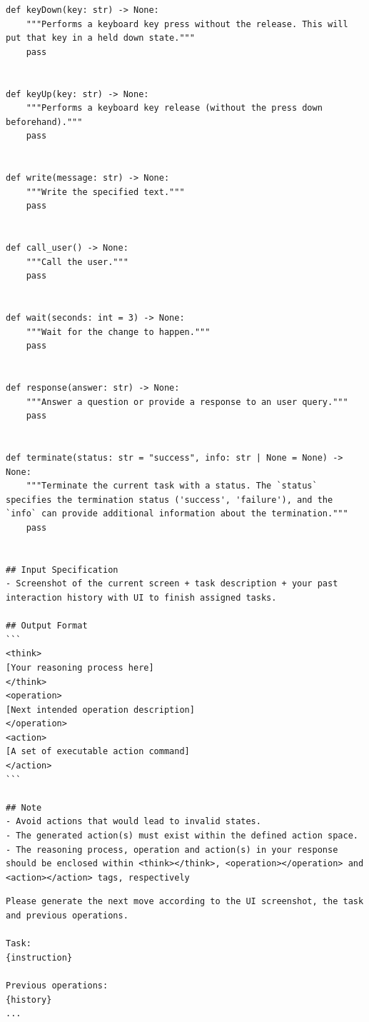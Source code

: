 \begin{tcolorbox}[title=System Prompt Template For Reasoned-Action Mode]
\begin{Verbatim}[breaklines=true, breaksymbol={}, breakanywhere=true]
def keyDown(key: str) -> None:
    """Performs a keyboard key press without the release. This will put that key in a held down state."""
    pass


def keyUp(key: str) -> None:
    """Performs a keyboard key release (without the press down beforehand)."""
    pass


def write(message: str) -> None:
    """Write the specified text."""
    pass


def call_user() -> None:
    """Call the user."""
    pass


def wait(seconds: int = 3) -> None:
    """Wait for the change to happen."""
    pass


def response(answer: str) -> None:
    """Answer a question or provide a response to an user query."""
    pass


def terminate(status: str = "success", info: str | None = None) -> None:
    """Terminate the current task with a status. The `status` specifies the termination status ('success', 'failure'), and the `info` can provide additional information about the termination."""
    pass


## Input Specification
- Screenshot of the current screen + task description + your past interaction history with UI to finish assigned tasks.

## Output Format
```
<think>
[Your reasoning process here]
</think>
<operation>
[Next intended operation description]
</operation>
<action>
[A set of executable action command]
</action>
```

## Note
- Avoid actions that would lead to invalid states.
- The generated action(s) must exist within the defined action space.
- The reasoning process, operation and action(s) in your response should be enclosed within <think></think>, <operation></operation> and <action></action> tags, respectively
\end{Verbatim}
\end{tcolorbox}

\begin{tcolorbox}[title=User Prompt Template For Direct-Action Mode and Reasoned-Action Mode]
\scriptsize
\begin{Verbatim}[breaklines=true, breaksymbol={}]
Please generate the next move according to the UI screenshot, the task and previous operations.

Task:
{instruction}

Previous operations:
{history}
...
\end{Verbatim}
\end{tcolorbox}

